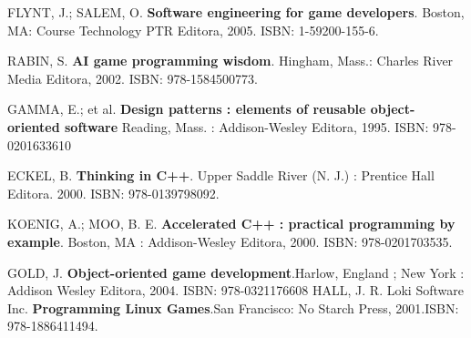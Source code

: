 \begin{thebibliography}{99}
    FLYNT, J.; SALEM, O. \textbf{Software engineering for game developers}. Boston, MA: Course Technology PTR Editora, 2005. ISBN: 1-59200-155-6.

    RABIN, S. \textbf{AI game programming wisdom}. Hingham, Mass.: Charles River Media Editora, 2002. ISBN: 978-1584500773.


GAMMA, E.; et al. \textbf{Design patterns : elements of reusable object-oriented software} Reading, Mass. : Addison-Wesley Editora, 1995. ISBN: 978-0201633610

    ECKEL, B. \textbf{Thinking in C++}. Upper Saddle River (N. J.) : Prentice Hall Editora. 2000. ISBN: 978-0139798092.

    KOENIG, A.; MOO, B. E. \textbf{Accelerated C++ : practical programming by example}. Boston, MA : Addison-Wesley Editora, 2000. ISBN: 978-0201703535.

    GOLD, J. \textbf{Object-oriented game development}.Harlow, England ; New York : Addison Wesley Editora, 2004. ISBN: 978-0321176608
    HALL, J. R. Loki Software Inc. \textbf{Programming Linux Games}.San Francisco: No Starch Press, 2001.ISBN: 978-1886411494.
 
\end{thebibliography}
